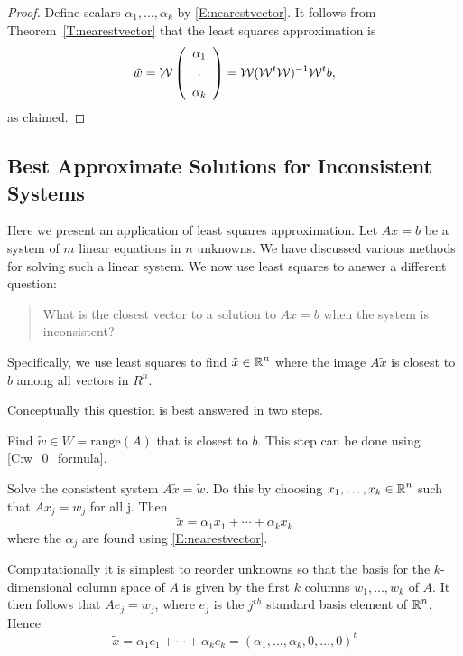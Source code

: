 \documentclass{ximera}
\begin{document}
\begin{proof}
Define scalars $\alpha_1,\ldots,\alpha_k$ by \eqref{E:nearestvector}.  It follows 
from Theorem~\ref{T:nearestvector} that the least squares approximation is
\[ 
\tilde{w} = \mathcal{W} \left(\begin{array}{c} \alpha_1 \\ \vdots \\ \alpha_k \end{array}\right) 
= \mathcal{W} (\mathcal{W}^t \mathcal{W} )^{-1} \mathcal{W}^t b, 
\]
as claimed.
\end{proof}


\subsection{Best Approximate Solutions for Inconsistent Systems}

Here we present an application of least squares approximation.
Let $Ax = b$ be a system of $m$ linear equations in $n$ unknowns.  
We have discussed various methods for solving such a linear system.  
We now use least squares to answer a different question: 
\begin{quote}
What is the closest vector to a solution to $Ax = b$ when the system is inconsistent?  
\end{quote}
Specifically, we use least squares to find $\tilde{x}\in\mbox{$\mathbb{R}$}^n$ where 
the image $A\tilde{x}$ is closest to $b$ among all vectors in $R^n$. 

Conceptually this question is best answered in two steps.  
\begin{enumeratea}
\item Find $\tilde{w}\in W = \mathrm{range}(A)$ that is closest to $b$.  
This step can be done using \eqref{C:w_0_formula}.
\item Solve the consistent system $A\tilde{x} = \tilde{w}$.  Do this by choosing  
$x_1,\ldots,x_k\in\mbox{$\mathbb{R}$}^n$ such that $Ax_j = w_j$ for all j.  Then 
\[
\tilde{x} = \alpha_1 x_1 + \cdots + \alpha_k x_k
\]
where the $\alpha_j$ are found using \eqref{E:nearestvector}.
\end{enumeratea} 
Computationally it is simplest to reorder unknowns so that the basis for the 
$k$-dimensional column space of $A$ is given by the first $k$ columns 
$w_1,\ldots,w_k$ of $A$. It then follows that $Ae_j = w_j$, where $e_j$ 
is the $j^{th}$ standard basis element of $\mbox{$\mathbb{R}$}^n$.  Hence
\[
\tilde{x} = \alpha_1 e_1 + \cdots + \alpha_k e_k  
= (\alpha_1,\ldots,\alpha_k, 0, \ldots,0)^t
\]
\end{document}
